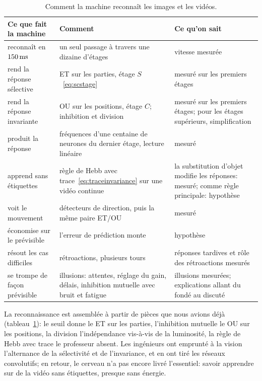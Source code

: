 \begin{table}[t]
\centering
\footnotesize
\setlength{\tabcolsep}{4pt}
\renewcommand{\arraystretch}{1.15}
\begin{tabular}{>{\raggedright}p{3.0cm}>{\raggedright}p{4.6cm}>{\raggedright\arraybackslash}p{5.2cm}}
\toprule
Ce que fait la machine & Comment & Ce qu'on sait \\
\midrule
reconnaît en $150\,\text{ms}$ & un seul passage à travers une dizaine d'étages & vitesse mesurée \\
rend la réponse sélective & ET sur les parties, étage $S$~\eqref{eq:scstage} & mesuré sur les premiers étages \\
rend la réponse invariante & OU sur les positions, étage $C$; inhibition et division & mesuré sur les premiers étages; pour les étages supérieurs, simplification \\
produit la réponse & fréquences d'une centaine de neurones du dernier étage, lecture linéaire & mesuré \\
apprend sans étiquettes & règle de Hebb avec trace~\eqref{eq:traceinvariance} sur une vidéo continue & la substitution d'objet modifie les réponses: mesuré; comme règle principale: hypothèse \\
voit le mouvement & détecteurs de direction, puis la même paire ET/OU & mesuré \\
économise sur le prévisible & l'erreur de prédiction monte & hypothèse \\
résout les cas difficiles & rétroactions, plusieurs tours & réponses tardives et rôle des rétroactions mesurés \\
se trompe de façon prévisible & illusions: attentes, réglage du gain, délais, inhibition mutuelle avec bruit et fatigue & illusions mesurées; explications allant du fondé au discuté \\
\bottomrule
\end{tabular}
\caption{Comment la machine reconnaît les images et les vidéos.}
\label{tab:recognition}
\end{table}

La reconnaissance est assemblée à partir de pièces que nous avions déjà (tableau~\ref{tab:recognition}): le seuil donne le ET sur les parties, l'inhibition mutuelle le OU sur les positions, la division l'indépendance vis-à-vis de la luminosité, la règle de Hebb avec trace le professeur absent. Les ingénieurs ont emprunté à la vision l'alternance de la sélectivité et de l'invariance, et en ont tiré les réseaux convolutifs; en retour, le cerveau n'a pas encore livré l'essentiel: savoir apprendre sur de la vidéo sans étiquettes, presque sans énergie.

